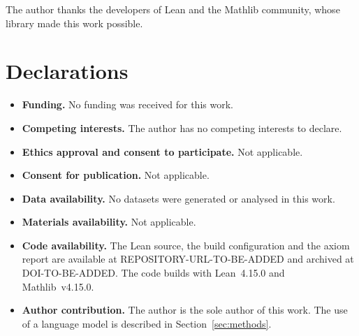 \documentclass[pdflatex,sn-mathphys-num]{sn-jnl}%
\theoremstyle{thmstyleone}%
\theoremstyle{thmstyletwo}%
\theoremstyle{thmstylethree}%
\begin{document}
\backmatter


The author thanks the developers of Lean and the Mathlib community, whose library made this work possible.

\section*{Declarations}

\begin{itemize}
\item \textbf{Funding.} No funding was received for this work.
\item \textbf{Competing interests.} The author has no competing interests to declare.
\item \textbf{Ethics approval and consent to participate.} Not applicable.
\item \textbf{Consent for publication.} Not applicable.
\item \textbf{Data availability.} No datasets were generated or analysed in this work.
\item \textbf{Materials availability.} Not applicable.
\item \textbf{Code availability.} The Lean source, the build configuration and the axiom report are available at REPOSITORY-URL-TO-BE-ADDED and archived at DOI-TO-BE-ADDED. The code builds with Lean~4.15.0 and Mathlib~v4.15.0.
\item \textbf{Author contribution.} The author is the sole author of this work. The use of a language model is described in Section~\ref{sec:methods}.
\end{itemize}


\end{document}
